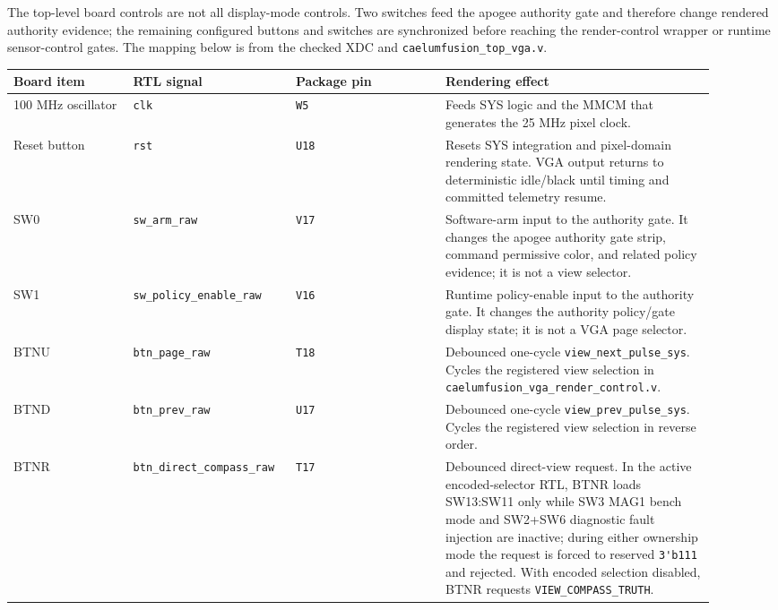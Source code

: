 \documentclass{article}
\newcommand{\sig}[1]{\begingroup\nolinkurl{#1}\endgroup}
\newcommand{\file}[1]{\begingroup\nolinkurl{#1}\endgroup}
\begin{document}
The top-level board controls are not all display-mode controls.  Two switches
feed the apogee authority gate and therefore change rendered authority evidence;
the remaining configured buttons and switches are synchronized before reaching
the render-control wrapper or runtime sensor-control gates.  The mapping below
is from the checked XDC and \file{caelumfusion_top_vga.v}.

\begin{longtable}{p{0.16\linewidth} p{0.19\linewidth} p{0.20\linewidth} p{0.36\linewidth}}
\toprule
\textbf{Board item} & \textbf{RTL signal} & \textbf{Package pin} & \textbf{Rendering effect} \\
\midrule
\endhead
100 MHz oscillator &
\sig{clk} &
\sig{W5} &
Feeds SYS logic and the MMCM that generates the 25 MHz pixel clock. \\

Reset button &
\sig{rst} &
\sig{U18} &
Resets SYS integration and pixel-domain rendering state.  VGA output returns to
deterministic idle/black until timing and committed telemetry resume. \\

SW0 &
\sig{sw_arm_raw} &
\sig{V17} &
Software-arm input to the authority gate.  It changes the apogee authority gate
strip, command permissive color, and related policy evidence; it is not a view
selector. \\

SW1 &
\sig{sw_policy_enable_raw} &
\sig{V16} &
Runtime policy-enable input to the authority gate.  It changes the authority
policy/gate display state; it is not a VGA page selector. \\

BTNU &
\sig{btn_page_raw} &
\sig{T18} &
Debounced one-cycle \sig{view_next_pulse_sys}.  Cycles the registered view
selection in \file{caelumfusion_vga_render_control.v}. \\

BTND &
\sig{btn_prev_raw} &
\sig{U17} &
Debounced one-cycle \sig{view_prev_pulse_sys}.  Cycles the registered view
selection in reverse order. \\

BTNR &
\sig{btn_direct_compass_raw} &
\sig{T17} &
Debounced direct-view request.  In the active encoded-selector RTL, BTNR loads
SW13:SW11 only while SW3 MAG1 bench mode and SW2+SW6 diagnostic fault injection
are inactive; during either ownership mode the request is forced to reserved
\sig{3'b111} and rejected.  With encoded selection disabled, BTNR requests
\sig{VIEW_COMPASS_TRUTH}. \\


\end{longtable}
\end{document}
